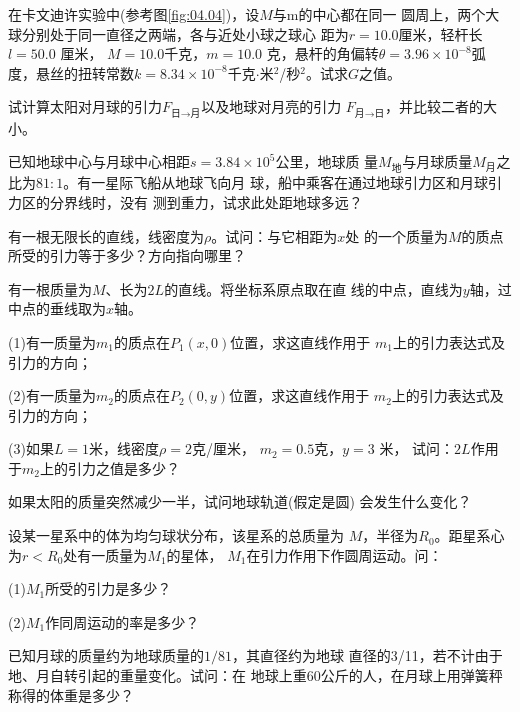\begin{exercises}

\exercise 在卡文迪许实验中(参考图\ref{fig:04.04})，设$ M $与$  $m的中心都在同一
圆周上，两个大球分别处于同一直径之两端，各与近处小球之球心
距为$  r = 1 0 . 0   $厘米，轻杆长$  l = 5 0 . 0  $ 厘米， $ M = 1 0 . 0  $千克，$  m = 1 0 . 0  $
克，悬杆的角偏转$  \theta = 3 . 9 6 \times 1 0 ^ { - 8 }  $弧度，悬丝的扭转常数$  k = 8 . 3 4
  \times 1 0 ^ { - 8 }  $千克$ \cdot $米$ ^2 $/秒$ ^2 $。试求$ G $之值。

\exercise 试计算太阳对月球的引力$ F _ {\text{日}\to\text{月}} $以及地球对月亮的引力
$ F _ {\text{月}\to\text{日}} $，并比较二者的大小。

\exercise 已知地球中心与月球中心相距$  s = 3 . 8 4 \times 1 0 ^ 5 $公里，地球质
量$ M _ {\text{地}} $与月球质量$ M _ {\text{月}}$之比为$ 81:1 $。有一星际飞船从地球飞向月
球，船中乘客在通过地球引力区和月球引力区的分界线时，没有
测到重力，试求此处距地球多远？

\exercise 有一根无限长的直线，线密度为$ \rho $。试问：与它相距为$ x $处
的一个质量为$ M $的质点所受的引力等于多少？方向指向哪里？

\clearpage
\exercise 有一根质量为$ M $、长为$ 2L $的直线。将坐标系原点取在直
线的中点，直线为$ y $轴，过中点的垂线取为$ x $轴。

(1)有一质量为$  m _ { 1 }   $的质点在$  P _ { 1 } \left( x, 0 \right)   $位置，求这直线作用于
$  m _ { 1 }   $上的引力表达式及引力的方向；

(2)有一质量为$  m _ { 2 }   $的质点在$  P _ { 2 } \left( 0, y \right)   $位置，求这直线作用于
$  m _ { 2 }   $上的引力表达式及引力的方向；

(3)如果$  L = 1   $米，线密度$  \rho = 2  $克/厘米， $ m _ { 2 } = 0 . 5   $克，$ y = 3  $ 米，
试问：$ 2L $作用于$  m _ { 2 }   $上的引力之值是多少？

\exercise 如果太阳的质量突然减少一半，试问地球轨道(假定是圆)
会发生什么变化？

\exercise 设某一星系中的体为均匀球状分布，该星系的总质量为
$ M $，半径为$  R _ { 0 } $。距星系心为$  r < R _ { 0 }   $处有一质量为$ M _ 1 $的星体，
$ M _ 1 $在引力作用下作圆周运动。问：

(1)$  M _  1    $所受的引力是多少？

(2)$ M _ 1 $作同周运动的率是多少？

\exercise 已知月球的质量约为地球质量的$ 1/81 $，其直径约为地球
直径的3/11，若不计由于地、月自转引起的重量变化。试问：在
地球上重60公斤的人，在月球上用弹簧秤称得的体重是多少？


\end{exercises}
